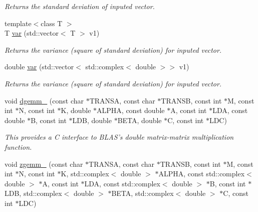 \begin{DoxyCompactItemize}
\begin{DoxyCompactList}\small\item\em Returns the standard deviation of inputed vector. \end{DoxyCompactList}\item 
\hypertarget{namespacekeycpp_a68e5d69d730e978061d7aeda2b49441c}{{\footnotesize template$<$class T $>$ }\\T \hyperlink{namespacekeycpp_a68e5d69d730e978061d7aeda2b49441c}{var} (std\-::vector$<$ T $>$ v1)}\label{namespacekeycpp_a68e5d69d730e978061d7aeda2b49441c}

\begin{DoxyCompactList}\small\item\em Returns the variance (square of standard deviation) for inputed vector. \end{DoxyCompactList}\item 
\hypertarget{namespacekeycpp_a391aed253df5e18fbc7f8502cbbe9293}{double \hyperlink{namespacekeycpp_a391aed253df5e18fbc7f8502cbbe9293}{var} (std\-::vector$<$ std\-::complex$<$ double $>$$>$ v1)}\label{namespacekeycpp_a391aed253df5e18fbc7f8502cbbe9293}

\begin{DoxyCompactList}\small\item\em Returns the variance (square of standard deviation) for inputed vector. \end{DoxyCompactList}\item 
\hypertarget{namespacekeycpp_a16b58f47ed977cafdc96227468f5f10a}{void \hyperlink{namespacekeycpp_a16b58f47ed977cafdc96227468f5f10a}{dgemm\-\_\-} (const char $\ast$T\-R\-A\-N\-S\-A, const char $\ast$T\-R\-A\-N\-S\-B, const int $\ast$M, const int $\ast$N, const int $\ast$K, double $\ast$A\-L\-P\-H\-A, const double $\ast$A, const int $\ast$L\-D\-A, const double $\ast$B, const int $\ast$L\-D\-B, double $\ast$B\-E\-T\-A, double $\ast$C, const int $\ast$L\-D\-C)}\label{namespacekeycpp_a16b58f47ed977cafdc96227468f5f10a}

\begin{DoxyCompactList}\small\item\em This provides a C interface to B\-L\-A\-S's double matrix-\/matrix multiplication function. \end{DoxyCompactList}\item 
\hypertarget{namespacekeycpp_a29fb4e46ee1b9cce0fd8bc79a2490c72}{void \hyperlink{namespacekeycpp_a29fb4e46ee1b9cce0fd8bc79a2490c72}{zgemm\-\_\-} (const char $\ast$T\-R\-A\-N\-S\-A, const char $\ast$T\-R\-A\-N\-S\-B, const int $\ast$M, const int $\ast$N, const int $\ast$K, std\-::complex$<$ double $>$ $\ast$A\-L\-P\-H\-A, const std\-::complex$<$ double $>$ $\ast$A, const int $\ast$L\-D\-A, const std\-::complex$<$ double $>$ $\ast$B, const int $\ast$L\-D\-B, std\-::complex$<$ double $>$ $\ast$B\-E\-T\-A, std\-::complex$<$ double $>$ $\ast$C, const int $\ast$L\-D\-C)}\label{namespacekeycpp_a29fb4e46ee1b9cce0fd8bc79a2490c72}


\end{DoxyCompactItemize}
